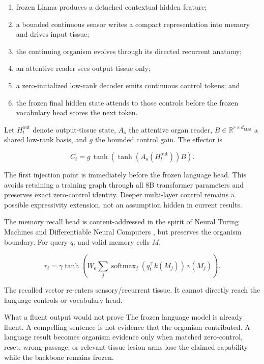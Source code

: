 \documentclass[11pt]{article}
\begin{document}
\begin{enumerate}
  \item frozen Llama produces a detached contextual hidden feature;
  \item a bounded continuous sensor writes a compact representation into memory and
        drives input tissue;
  \item the continuing organism evolves through its directed recurrent anatomy;
  \item an attentive reader sees output tissue only;
  \item a zero-initialized low-rank decoder emits continuous control tokens; and
  \item the frozen final hidden state attends to those controls before the frozen
        vocabulary head scores the next token.
\end{enumerate}

Let $H_t^{\mathrm{out}}$ denote output-tissue state, $A_o$ the attentive organ reader,
$B\in\mathbb{R}^{r\times d_{\mathrm{LLM}}}$ a shared low-rank basis, and $g$ the bounded
control gain. The effector is

\begin{equation}
  C_t = g\,\tanh\!\left(\tanh(A_o(H_t^{\mathrm{out}}))B\right).
\end{equation}

The first injection point is immediately before the frozen language head. This avoids
retaining a training graph through all 8B transformer parameters and preserves exact
zero-control identity. Deeper multi-layer control remains a possible expressivity
extension, not an assumption hidden in current results.

The memory recall head is content-addressed in the spirit of Neural Turing Machines and
Differentiable Neural Computers \cite{graves2014ntm,graves2016dnc}, but preserves the
organism boundary. For query $q_t$ and valid memory cells $M$,

\begin{equation}
  r_t = \gamma\tanh\!\left(W_o\sum_j
  \operatorname{softmax}_j(q_t^\top k(M_j))\,v(M_j)\right).
\end{equation}

The recalled vector re-enters sensory/recurrent tissue. It cannot directly reach the
language controls or vocabulary head.

\begin{warningbox}{What a fluent output would not prove}
The frozen language model is already fluent. A compelling sentence is not evidence that
the organism contributed. A language result becomes organism evidence only when matched
zero-control, reset, wrong-passage, or relevant-tissue lesion arms lose the claimed
capability while the backbone remains frozen.
\end{warningbox}
\end{document}
